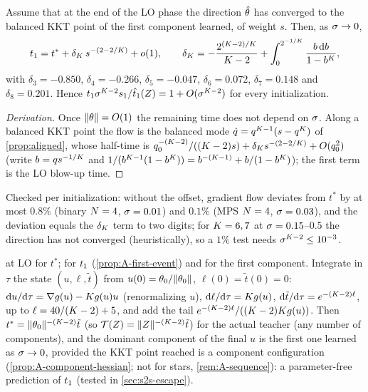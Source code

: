 \begin{proposition}\label{prop:A-first-event}
  \derived{} 
  Assume that at the end of the LO phase the direction $\hat{\theta}$ has converged to the balanced KKT
  point of the first component learned, of weight $s$. Then, as $\sigma\to0$,
  \begin{equation}\label{eq:A-first-event}
    t_{1}=t^*+\delta_K\,s^{-(2-2/K)}+o(1),\qquad
    \delta_K=-\frac{2^{(K-2)/K}}{K-2}+\int_0^{2^{-1/K}}\frac{b\,\mathrm{d} b}{1-b^K},
  \end{equation}
  with $\delta_3=-0.850$, $\delta_4=-0.266$, $\delta_5=-0.047$, $\delta_6=0.072$, $\delta_7=0.148$ and
  $\delta_8=0.201$. Hence $t_{1}\sigma^{K-2}s_{1}/\hat t_1(Z)=1+O(\sigma^{K-2})$ for every initialization.
\end{proposition}
\begin{proof}[Derivation]
  Once $\lVert\theta\rVert=O(1)$ the remaining time does not depend on $\sigma$. Along a balanced KKT point the
  flow is the balanced mode $\dot q=q^{K-1}(s-q^K)$ of \cref{prop:aligned}, whose half-time is
  $q_0^{-(K-2)}/((K-2)s)+\delta_K s^{-(2-2/K)}+O(q_0^2)$ (write $b=qs^{-1/K}$ and
  $1/(b^{K-1}(1-b^K))=b^{-(K-1)}+b/(1-b^K)$); the first term is the LO blow-up time.
\end{proof}
Checked per initialization: without the offset, gradient flow deviates from $t^*$ by at most $0.8\%$ (binary
$N=4$, $\sigma=0.01$) and $0.1\%$ (MPS $N=4$, $\sigma=0.03$), and the deviation equals the $\delta_K$ term to two
digits; for $K=6,7$ at $\sigma=0.15$--$0.5$ the direction has not converged (heuristically), so a $1\%$ test needs
$\sigma^{K-2}\le10^{-3}$.

\begin{remark}\label{rem:A-recipe}
  \proven{} at LO for $t^*$; \derived{} for $t_{1}$ (\cref{prop:A-first-event}) and for the first component.
  Integrate in $\tau$ the state $(u,\ell,\tilde t)$ from $u(0)=\theta_0/\lVert\theta_0\rVert$,
  $\ell(0)=\tilde t(0)=0$: $\mathrm{d} u/\mathrm{d}\tau=\nabla g(u)-K g(u)u$ (renormalizing $u$), $\mathrm{d}\ell/\mathrm{d}\tau=K g(u)$,
  $\mathrm{d}\tilde t/\mathrm{d}\tau=e^{-(K-2)\ell}$, up to $\ell=40/(K-2)+5$, and add the tail
  $e^{-(K-2)\ell}/((K-2)K g(u))$. Then $t^*=\lVert\theta_0\rVert^{-(K-2)}\tilde t$ (so $\mathcal T(Z)=\lVert Z\rVert^{-(K-2)}\tilde t$)
  for the actual teacher (any number of components), and the dominant component of the final $u$ is the first one learned as
  $\sigma\to0$, provided the KKT point reached is a component configuration (\cref{prop:A-component-hessian};
  not for stars, \cref{rem:A-sequence}): a parameter-free prediction of $t_{1}$ (tested in
  \cref{sec:s2s-escape}).
\end{remark}

